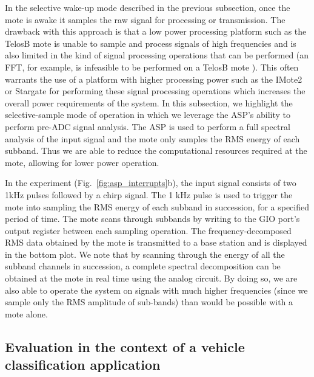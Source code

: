 In the selective wake-up mode described in the previous subsection, once the mote is awake it samples the raw signal for processing or transmission. The drawback with this approach is that a low power processing platform such as the TelosB mote is unable to sample and process signals of high frequencies and is also limited in the kind of signal processing operations that can be performed (an FFT, for example, is infeasible to be performed on a TelosB mote \cite{vango}). This often warrants the use of a platform with higher processing power such as the IMote2 or Stargate \cite{stargate} for performing these signal processing operations which increases the overall power requirements of the system. In this subsection, we highlight the selective-sample mode of operation in which we leverage the ASP's ability to perform pre-ADC signal analysis. The ASP is used to perform a full spectral analysis of the input signal and the mote only samples the RMS energy of each subband. Thus we are able to reduce the computational resources required at the mote, allowing for lower power operation.

 In the experiment (Fig.~\ref{fig:asp_interrupts}b), the input signal consists of two 1kHz pulses followed by a chirp signal. The 1 kHz pulse is used to trigger the mote into sampling the RMS energy of each subband in succession, for a specified period of time. The mote scans through subbands by writing to the GIO port's output register between each sampling operation.  The frequency-decomposed RMS data obtained by the mote is transmitted to a base station and is displayed in the bottom plot. We note that by scanning through the energy of all the subband channels in succession, a complete spectral decomposition can be obtained at the mote in real time using the analog circuit. By doing so, we are also able to operate the system on signals with much higher frequencies (since we sample only the RMS amplitude of sub-bands) than would be possible with a mote alone.



\subsection{Evaluation in the context of a vehicle classification application}



